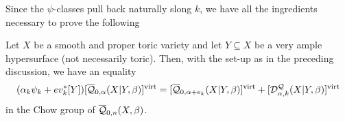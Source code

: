  Since the $\psi$-classes pull back naturally slong $k$, we have all the ingredients necessary to prove the following
 
\begin{thm} Let $X$ be a smooth and proper toric variety and let $Y \subseteq X$ be a very ample hypersurface (not necessarily toric). Then, with the set-up as in the preceding discussion, we have an equality
\begin{equation*} (\alpha_k \psi_k + ev_k^* [Y]) [\overline{\mathcal Q}_{0,\alpha}(X|Y,\beta)]^{\operatorname{virt}} = [\overline{\mathcal Q}_{0,\alpha+e_k}(X|Y,\beta)]^{\operatorname{virt}} + [\mathcal D^\mathcal{Q}_{\alpha,k}(X|Y,\beta)]^{\operatorname{virt}} \end{equation*}
in the Chow group of $\overline{\mathcal Q}_{0,n}(X,\beta)$. \end{thm}